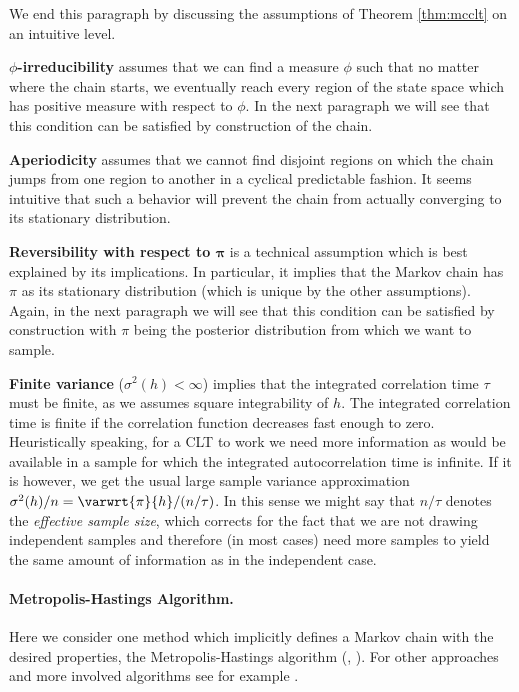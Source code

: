 \noindent
We end this paragraph by discussing the assumptions of Theorem \ref{thm:mcclt} on an intuitive level.

\textbf{$\phi$-irreducibility} assumes that we can find a measure $\phi$ such that no matter where the chain starts, we eventually reach every region of the state space which has positive measure with respect to $\phi$.
In the next paragraph we will see that this condition can be satisfied by construction of the chain.

\textbf{Aperiodicity} assumes that we cannot find disjoint regions on which the chain jumps from one region to another in a cyclical predictable fashion.
It seems intuitive that such a behavior will prevent the chain from actually converging to its stationary distribution.

\textbf{Reversibility with respect to $\bm{\pi}$} is a technical assumption which is best explained by its implications.
In particular, it implies that the Markov chain has $\pi$ as its stationary distribution (which is unique by the other assumptions).
Again, in the next paragraph we will see that this condition can be satisfied by construction with $\pi$ being the posterior distribution from which we want to sample.

\textbf{Finite variance} ($\sigma^2(h) < \infty$) implies that the integrated correlation time $\tau$ must be finite, as we assumes square integrability of $h$.
The integrated correlation time is finite if the correlation function decreases fast enough to zero.
Heuristically speaking, for a CLT to work we need more information as would be available in a sample for which the integrated autocorrelation time is infinite.
If it is however, we get the usual large sample variance approximation $\sigma^2(h) / n = \varwrt{\pi}{h} / (n/\tau)$.
In this sense we might say that $n/\tau$ denotes the \emph{effective sample size}, which corrects for the fact that we are not drawing independent samples and therefore (in most cases) need more samples to yield the same amount of information as in the independent case.

\paragraph{Metropolis-Hastings Algorithm.}
Here we consider one method which implicitly defines a Markov chain with the desired properties, the Metropolis-Hastings algorithm (\citet{Metropolis1953}, \citet{hastings70}).
For other approaches and more involved algorithms see for example \citet{liang10}.

